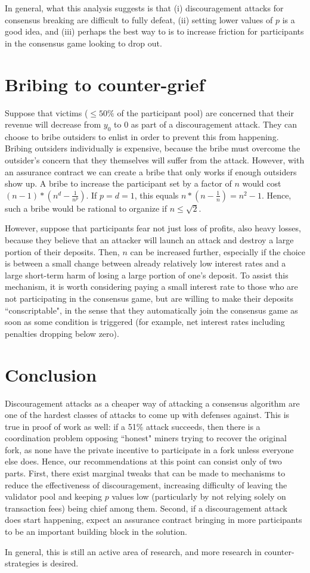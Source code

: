 \documentclass[12pt]{article}
\begin{document}
In general, what this analysis suggests is that (i) discouragement attacks for consensus breaking are difficult to fully defeat, (ii) setting lower values of $p$ is a good idea, and (iii) perhaps the best way to is to increase friction for participants in the consensus game looking to drop out.

\section{Bribing to counter-grief}

Suppose that victims ($\le 50\%$ of the participant pool) are concerned that their revenue will decrease from $y_0$ to 0 as part of a discouragement attack. They can choose to bribe outsiders to enlist in order to prevent this from happening. Bribing outsiders individually is expensive, because the bribe must overcome the outsider's concern that they themselves will suffer from the attack. However, with an assurance contract we can create a bribe that only works if enough outsiders show up. A bribe to increase the participant set by a factor of $n$ would cost $(n - 1) * (n^d - \frac{1}{n^p})$. If $p = d = 1$, this equals $n * (n - \frac{1}{n}) = n^2 - 1$. Hence, such a bribe would be rational to organize if $n \le \sqrt{2}$.

However, suppose that participants fear not just loss of profits, also heavy losses, because they believe that an attacker will launch an attack and destroy a large portion of their deposits. Then, $n$ can be increased further, especially if the choice is between a small change between already relatively low interest rates and a large short-term harm of losing a large portion of one's deposit. To assist this mechanism, it is worth considering paying a small interest rate to those who are not participating in the consensus game, but are willing to make their deposits ``conscriptable", in the sense that they automatically join the consensus game as soon as some condition is triggered (for example, net interest rates including penalties dropping below zero).


\section{Conclusion}

Discouragement attacks as a cheaper way of attacking a consensus algorithm are one of the hardest classes of attacks to come up with defenses against. This is true in proof of work as well: if a 51\% attack succeeds, then there is a coordination problem opposing ``honest" miners trying to recover the original fork, as none have the private incentive to participate in a fork unless everyone else does. Hence, our recommendations at this point can consist only of two parts. First, there exist marginal tweaks that can be made to mechanisms to reduce the effectiveness of discouragement, increasing difficulty of leaving the validator pool and keeping $p$ values low (particularly by not relying solely on transaction fees) being chief among them. Second, if a discouragement attack does start happening, expect an assurance contract bringing in more participants to be an important building block in the solution.

In general, this is still an active area of research, and more research in counter-strategies is desired.



\end{document}
